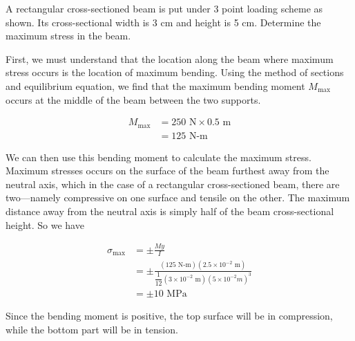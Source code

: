\documentclass[
10pt,
a4paper,
openany,
svgnames,
]{book}
\begin{document}
\begin{example}
  A rectangular cross-sectioned beam is put under 3 point loading scheme as shown. Its cross-sectional width is 3 cm and height is 5 cm. Determine the maximum stress in the beam.

  \begin{figure}[H]
    \centering
  \end{figure}
\end{example}

\begin{solution}
  First, we must understand that the location along the beam where maximum stress occurs is the location of maximum bending. Using the method of sections and equilibrium equation, we find that the maximum bending moment $M_{\max}$ occurs at the middle of the beam between the two supports.

  \begin{align*}
    M_{\max} &= 250 \text{ N} \times 0.5 \text{ m} \\
             &= 125 \text{ N-m}
  \end{align*}
  
  We can then use this bending moment to calculate the maximum stress. Maximum stresses occurs on the surface of the beam furthest away from the neutral axis, which in the case of a rectangular cross-sectioned beam, there are two—namely compressive on one surface and tensile on the other. The maximum distance away from the neutral axis is simply half of the beam cross-sectional height. So we have
  
  \begin{align*}
    \sigma_{\max} &= \pm \frac{My}{I} \\
                  &= \pm \frac{(125 \text{ N-m})(2.5 \times 10^{-2} \text{ m})}{ \dfrac{1}{12}(3 \times 10^{-2} \text{ m})(5 \times 10^{-2} m)^3} \\
                  &= \pm 10 \text{ MPa}
  \end{align*}
  
Since the bending moment is positive, the top surface will be in compression, while the bottom part will be in tension.
\end{solution}
\end{document}
